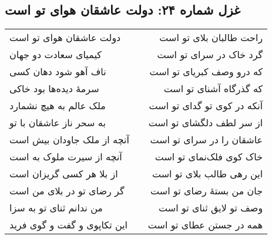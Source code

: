 \begin{center}
\section*{غزل شماره ۲۴: دولت عاشقان هوای تو است}
\label{sec:024}
\begin{longtable}{l p{0.5cm} r}
دولت عاشقان هوای تو است
&&
راحت طالبان بلای تو است
\\
کیمیای سعادت دو جهان
&&
گرد خاک در سرای تو است
\\
ناف آهو شود دهان کسی
&&
که درو وصف کبریای تو است
\\
سرمهٔ دیده‌ها بود خاکی
&&
که گذرگاه آشنای تو است
\\
ملک عالم به هیچ نشمارد
&&
آنکه در کوی تو گدای تو است
\\
به سحر ناز عاشقان با تو
&&
از سر لطف دلگشای تو است
\\
آنچه از ملک جاودان بیش است
&&
عاشقان را در سرای تو است
\\
آنچه از سیرت ملوک به است
&&
خاک کوی فلک‌نمای تو است
\\
از بلا هر کسی گریزان است
&&
این رهی طالب بلای تو است
\\
گر رضای تو در بلای من است
&&
جان من بستهٔ رضای تو است
\\
من ندانم ثنای تو به سزا
&&
وصف تو لایق ثنای تو است
\\
این تکاپوی و گفت و گوی فرید
&&
همه در جستن عطای تو است
\\
\end{longtable}
\end{center}
